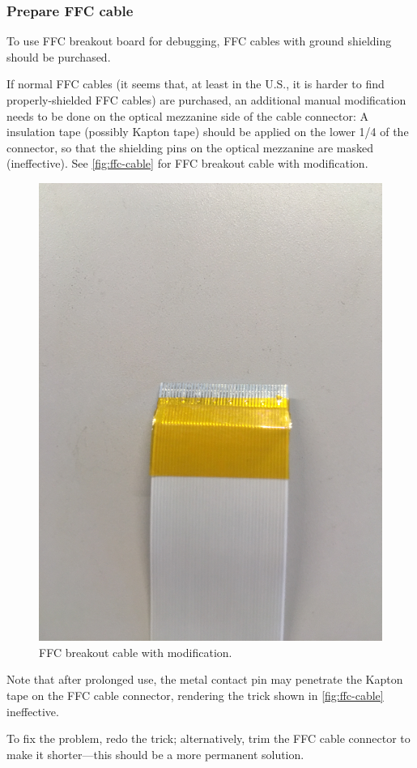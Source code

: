 \subsubsection{Prepare FFC cable}
To use FFC breakout board for debugging, FFC cables with ground shielding should
be purchased.

If normal FFC cables (it seems that, at least in the U.S., it is harder to find
properly-shielded FFC cables) are purchased, an additional manual modification
needs to be done on the optical mezzanine side of the cable connector:
A insulation tape (possibly Kapton tape) should be applied on the lower 1/4 of
the connector, so that the shielding pins on the optical mezzanine are masked
(ineffective).
See \autoref{fig:ffc-cable} for FFC breakout cable with modification.

\begin{figure}[!ht]
    \centering
    \includegraphics[width=0.9\linewidth]{res/ffc_breakout_cable_with_tape.jpg}
    \caption{FFC breakout cable with modification.}
    \label{fig:ffc-cable}
\end{figure}

\begin{leftbar}
    Note that after prolonged use, the metal contact pin may penetrate the
    Kapton tape on the FFC cable connector, rendering the trick shown in
    \autoref{fig:ffc-cable} ineffective.

    To fix the problem, redo the trick;
    alternatively, trim the FFC cable connector to make it shorter---this should
    be a more permanent solution.
\end{leftbar}
